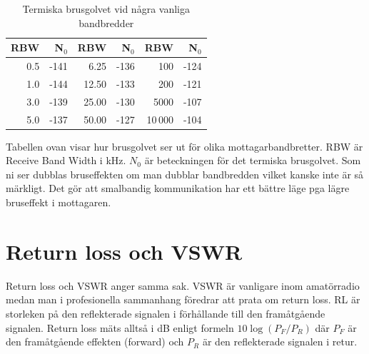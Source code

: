 \begin{table}[H]
\centering
\begin{tabular}{rr|rr|rr}
	\textbf{RBW} & \textbf{N$_0$} & \textbf{RBW} & \textbf{N$_0$} & \textbf{RBW} & \textbf{N$_0$} \\ \hline
	         0.5 &           -141 &         6.25 &           -136 &          100 &           -124 \\
	         1.0 &           -144 &        12.50 &           -133 &          200 &           -121 \\
	         3.0 &           -139 &        25.00 &           -130 &         5000 &           -107 \\
	         5.0 &           -137 &        50.00 &           -127 &        10\,000 &           -104
\end{tabular}
\caption{Termiska brusgolvet vid några vanliga bandbredder}
\end{table}

Tabellen ovan visar hur brusgolvet ser ut för olika mottagarbandbretter. RBW är
Receive Band Width i kHz. $N_0$ är beteckningen för det termiska brusgolvet. Som
ni ser dubblas bruseffekten om man dubblar bandbredden vilket kanske inte är så
märkligt. Det gör att smalbandig kommunikation har ett bättre läge pga lägre
bruseffekt i mottagaren.


\section{Return loss och VSWR}

Return loss och VSWR anger samma sak. VSWR är vanligare inom amatörradio medan
man i profesionella sammanhang föredrar att prata om return loss. RL är
storleken på den reflekterade signalen i förhållande till den framåtgående
signalen. Return loss mäts alltså i dB enligt formeln $10\log(P_F/P_R)$ där
$P_F$ är den framåtgående effekten (forward) och $P_R$ är den reflekterade
signalen i retur.

